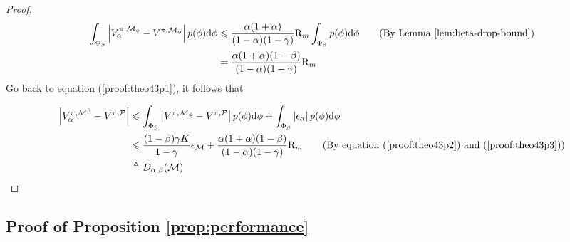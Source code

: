 \begin{proof}
\begin{align}
\int_{\Phi_\beta}\left|{V}_\alpha^{\pi, \mathcal{M}_{\phi}} - {V}^{\pi,\mathcal{M}_{\phi}}\right|p(\phi)\mathrm{d}\phi&\leq \frac{\alpha(1+\alpha)}{(1-\alpha)(1-\gamma)}\mathrm{R}_m\int_{\Phi_\beta}p(\phi)\mathrm{d}\phi \tag{By Lemma \ref{lem:beta-drop-bound}}\\
&=\frac{\alpha(1+\alpha)(1-\beta)}{(1-\alpha)(1-\gamma)}\mathrm{R}_m \label{proof:theo43p3}
\end{align}
Go back to equation (\ref{proof:theo43p1}), it follows that

\begin{align*}
\left|{V}_\alpha^{\pi, \mathcal{M}^\beta}-{V}^{\pi, \mathcal{P}}\right| &\leq \int_{\Phi_\beta}\left|{V}^{\pi, \mathcal{M}_{\phi}}-{V}^{\pi, \mathcal{P}}\right|p(\phi)\mathrm{d}\phi+\int_{\Phi_\beta}\left|\epsilon_\alpha\right|p(\phi)\mathrm{d}\phi\\
&\leq \frac{(1-\beta)\gamma K}{1-\gamma}\epsilon_{\mathcal{M}}+\frac{\alpha(1+\alpha)(1-\beta)}{(1-\alpha)(1-\gamma)}\mathrm{R}_m \tag{By equation (\ref{proof:theo43p2}) and (\ref{proof:theo43p3})}\\
&\triangleq D_{\alpha,\beta}(\mathcal{M})
\end{align*}

\end{proof}

\subsection{Proof of Proposition \ref{prop:performance}}

